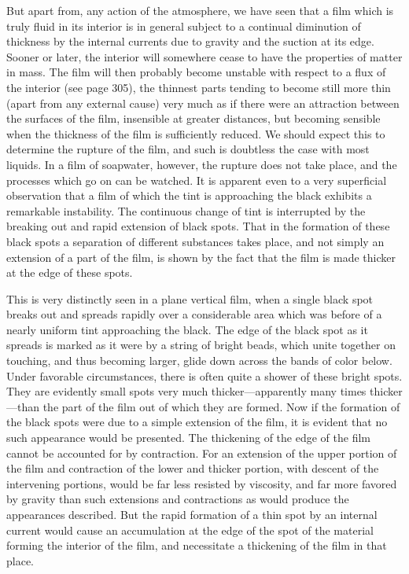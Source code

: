 \documentclass[12pt]{article}
\begin{document}
But apart from, any action of the atmosphere, we have seen that a film which is truly fluid in its interior is in general subject to a continual diminution of thickness by the internal currents due to gravity and the suction at its edge. Sooner or later, the interior will somewhere cease to have the properties of matter in mass. The film will then probably become unstable with respect to a flux of the interior (see page 305), the thinnest parts tending to become still more thin (apart from any external cause) very much as if there were an attraction between the surfaces of the film, insensible at greater distances, but becoming sensible when the thickness of the film is sufficiently reduced. %
We should expect this to determine the rupture of the film, and such is doubtless the case with most liquids. In a film of soapwater, however, the rupture does not take place, and the processes which go on can be watched. It is apparent even to a very superficial observation that a film of which the tint is approaching the black exhibits a remarkable instability. The continuous change of tint is interrupted by the breaking out and rapid extension of black spots. That in the formation of these black spots a separation of different substances takes place, and not simply an extension of a part of the film, is shown by the fact that the film is made thicker at the edge of these spots.

This is very distinctly seen in a plane vertical film, when a single black spot breaks out and spreads rapidly over a considerable area which was before of a nearly uniform tint approaching the black. The edge of the black spot as it spreads is marked as it were by a string of bright beads, which unite together on touching, and thus becoming larger, glide down across the bands of color below. Under favorable circumstances, there is often quite a shower of these bright spots. They are evidently small spots very much thicker---apparently many times thicker---than the part of the film out of which they are formed. Now if the formation of the black spots were due to a simple extension of the film, it is evident that no such appearance would be presented. The thickening of the edge of the film cannot be accounted for by contraction. For an extension of the upper portion of the film and contraction of the lower and thicker portion, with descent of the intervening portions, would be far less resisted by viscosity, and far more favored by gravity than such extensions and contractions as would produce the appearances described.  But the rapid formation of a thin spot by an internal current would cause an accumulation at the edge of the spot of the material forming the interior of the film, and necessitate a thickening of the film in that place.
\end{document}
